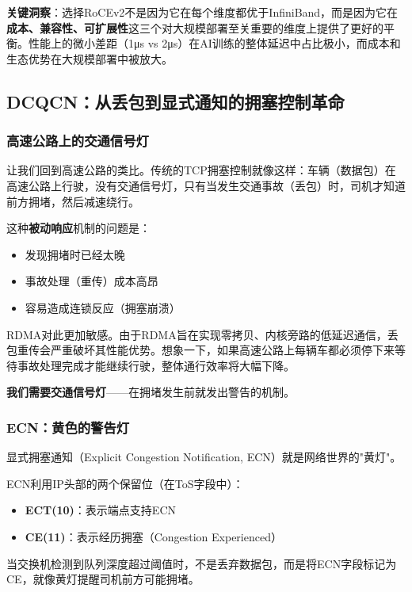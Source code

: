 \textbf{关键洞察}：选择RoCEv2不是因为它在每个维度都优于InfiniBand，而是因为它在\textbf{成本、兼容性、可扩展性}这三个对大规模部署至关重要的维度上提供了更好的平衡。性能上的微小差距（1μs vs 2μs）在AI训练的整体延迟中占比极小，而成本和生态优势在大规模部署中被放大。

\subsection{DCQCN：从丢包到显式通知的拥塞控制革命}

\subsubsection{高速公路上的交通信号灯}

让我们回到高速公路的类比。传统的TCP拥塞控制就像这样：车辆（数据包）在高速公路上行驶，没有交通信号灯，只有当发生交通事故（丢包）时，司机才知道前方拥堵，然后减速绕行。

这种\textbf{被动响应}机制的问题是：
\begin{itemize}
    \item 发现拥堵时已经太晚
    \item 事故处理（重传）成本高昂
    \item 容易造成连锁反应（拥塞崩溃）
\end{itemize}

RDMA对此更加敏感。由于RDMA旨在实现零拷贝、内核旁路的低延迟通信，丢包重传会严重破坏其性能优势。想象一下，如果高速公路上每辆车都必须停下来等待事故处理完成才能继续行驶，整体通行效率将大幅下降。

\textbf{我们需要交通信号灯}——在拥堵发生前就发出警告的机制。

\subsubsection{ECN：黄色的警告灯}

显式拥塞通知（Explicit Congestion Notification, ECN）就是网络世界的"黄灯"。

ECN利用IP头部的两个保留位（在ToS字段中）：
\begin{itemize}
    \item \textbf{ECT(10)}：表示端点支持ECN
    \item \textbf{CE(11)}：表示经历拥塞（Congestion Experienced）
\end{itemize}

当交换机检测到队列深度超过阈值时，不是丢弃数据包，而是将ECN字段标记为CE，就像黄灯提醒司机前方可能拥堵。

